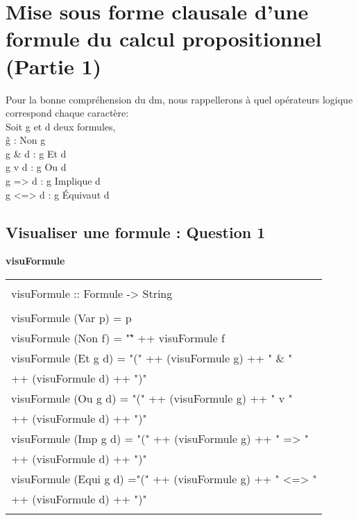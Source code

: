 \documentclass{article}
\newenvironment{code}[1]
    {\begin{center}
    \textbf{#1\\[1ex]}
    \begin{tabular}{|p{0.9\textwidth}|}
    \hline\\
    }
    { 
    \\\\\hline
    \end{tabular} 
    \end{center}
    }
\begin{document}

\newpage

\thispagestyle{empty}
\tableofcontents
\newpage


\section{Mise sous forme clausale d’une formule du calcul propositionnel (Partie 1)}
Pour la bonne compréhension du dm, nous rappellerons à quel opérateurs logique correspond chaque caractère:\\
Soit g et d deux formules,\\
\~g :  Non g \\
g \& d : g Et d \\
g v d : g Ou d \\
g => d : g Implique d\\
g <=> d : g Équivaut d\\


\subsection{Visualiser une formule : Question 1}	
\begin{code}{visuFormule}
    visuFormule :: Formule -> String \\
    \\
    visuFormule (Var p) = p \\
    visuFormule (Non f) = "\~" ++ visuFormule f\\
    visuFormule (Et g d) = "(" ++ (visuFormule g) ++ " \& " \\
                            ++ (visuFormule d) ++ ")" \\
    visuFormule (Ou g d) =  "(" ++ (visuFormule g) ++ " v " \\
                            ++ (visuFormule d) ++ ")" \\
    visuFormule (Imp g d) = "(" ++ (visuFormule g) ++ " => " \\ 
                            ++ (visuFormule d) ++ ")" \\
    visuFormule (Equi g d) ="(" ++ (visuFormule g) ++ " <=> " \\
                        ++ (visuFormule d) ++ ")" 
\end{code}
\end{document}
